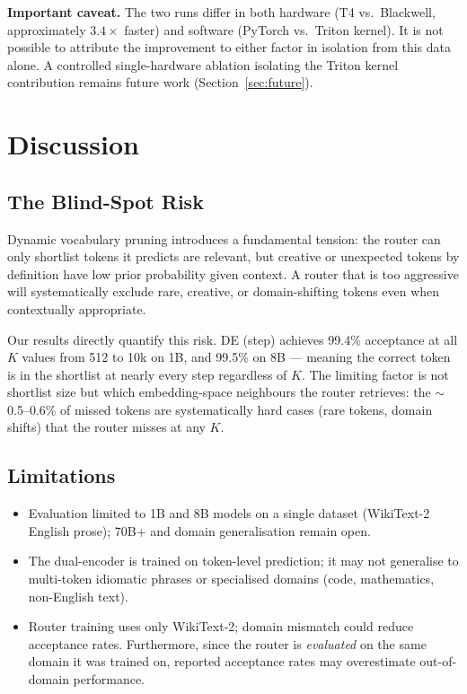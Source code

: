 \documentclass[twocolumn,10pt]{article}
\begin{document}
\textbf{Important caveat.} The two runs differ in both hardware (T4 vs.\
Blackwell, approximately $3.4\times$ faster) and software (PyTorch vs.\
Triton kernel). It is not possible to attribute the improvement to either
factor in isolation from this data alone. A controlled single-hardware
ablation isolating the Triton kernel contribution remains future work
(Section~\ref{sec:future}).

\section{Discussion}

\subsection{The Blind-Spot Risk}

Dynamic vocabulary pruning introduces a fundamental tension: the router can
only shortlist tokens it predicts are relevant, but creative or unexpected
tokens by definition have low prior probability given context. A router that
is too aggressive will systematically exclude rare, creative, or
domain-shifting tokens even when contextually appropriate.

Our results directly quantify this risk. DE (step) achieves 99.4\% acceptance
at all $K$ values from 512 to 10k on 1B, and 99.5\% on 8B --- meaning the
correct token is in the shortlist at nearly every step regardless of $K$.
The limiting factor is not shortlist size but which embedding-space neighbours
the router retrieves: the $\sim$0.5--0.6\% of missed tokens are systematically hard
cases (rare tokens, domain shifts) that the router misses at any $K$.

\subsection{Limitations}

\begin{itemize}[leftmargin=*, itemsep=1pt, topsep=2pt]
  \item Evaluation limited to 1B and 8B models on a single dataset
        (WikiText-2 English prose); 70B+ and domain generalisation remain open.
  \item The dual-encoder is trained on token-level prediction; it may not
        generalise to multi-token idiomatic phrases or specialised domains
        (code, mathematics, non-English text).
  \item Router training uses only WikiText-2; domain mismatch could reduce
        acceptance rates. Furthermore, since the router is \emph{evaluated} on
        the same domain it was trained on, reported acceptance rates may
        overestimate out-of-domain performance.
\end{itemize}
\end{document}

